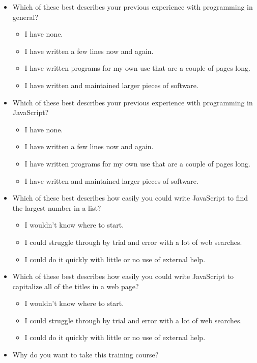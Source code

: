 \begin{itemize}
\tightlist
\item
  Which of these best describes your previous experience with
  programming in general?

  \begin{itemize}
  \tightlist
  \item
    I have none.
  \item
    I have written a few lines now and again.
  \item
    I have written programs for my own use that are a couple of
    pages long.
  \item
    I have written and maintained larger pieces of software.
  \end{itemize}
\item
  Which of these best describes your previous experience with
  programming in JavaScript?

  \begin{itemize}
  \tightlist
  \item
    I have none.
  \item
    I have written a few lines now and again.
  \item
    I have written programs for my own use that are a couple of
    pages long.
  \item
    I have written and maintained larger pieces of software.
  \end{itemize}
\item
  Which of these best describes how easily you could write JavaScript
  to find the largest number in a list?

  \begin{itemize}
  \tightlist
  \item
    I wouldn't know where to start.
  \item
    I could struggle through by trial and error with a lot of web
    searches.
  \item
    I could do it quickly with little or no use of external help.
  \end{itemize}
\item
  Which of these best describes how easily you could write JavaScript
  to capitalize all of the titles in a web page?

  \begin{itemize}
  \tightlist
  \item
    I wouldn't know where to start.
  \item
    I could struggle through by trial and error with a lot of web
    searches.
  \item
    I could do it quickly with little or no use of external help.
  \end{itemize}
\item
  Why do you want to take this training course?
\end{itemize}


